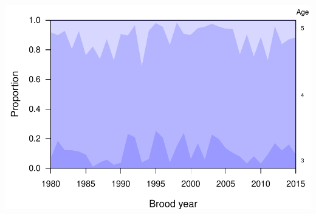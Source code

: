 \documentclass[11pt,]{article}
\begin{document}
\includegraphics{App_3_Summarize_results_files/figure-latex/plot_age_comp-1.pdf}
\end{document}
